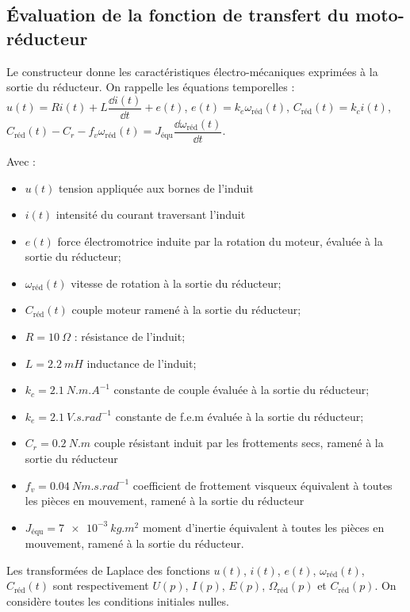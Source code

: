 \begin{multicols}{2}
\subsection*{Évaluation de la fonction de transfert du moto-réducteur}
\ifprof
\else
Le constructeur donne les caractéristiques électro-mécaniques exprimées à la sortie du réducteur.
On rappelle les équations temporelles :
$u(t) = R i(t) + L \dfrac{\dd i(t)}{\dd t} + e(t)$, $e(t) = k_e  \omega_{\text{réd}}(t)$, 
$C_{\text{réd}} (t)= k_c  i(t)$, $C_{\text{réd}} (t) - C_r - f_v \omega_{\text{réd}}(t)= J_{\text{équ}} \dfrac{\dd \omega_{\text{réd}}(t)}{\dd t}$. 

Avec :
\begin{itemize}
\item $u(t)$ tension appliquée aux bornes de l’induit 
\item $i(t)$ intensité du courant traversant l’induit
\item $e(t)$ force électromotrice induite par la rotation du moteur, évaluée à la  sortie du réducteur;
\item $\omega_{\text{réd}}(t)$ vitesse de rotation à la sortie du réducteur;
\item $C_{\text{réd}} (t)$ couple moteur ramené à la sortie du réducteur;
\item $R = \SI{10}{\Omega}$ : résistance de l’induit;
\item $L = \SI{2,2}{mH}$ inductance de l’induit;
\item $k_c = \SI{2,1}{N.m.A^{-1}}$ constante de couple évaluée à la sortie du réducteur;
\item $k_e = \SI{2,1}{V.s.rad^{-1}}$ constante de f.e.m évaluée à la sortie du réducteur;
\item $C_r = \SI{0,2}{N.m}$ couple résistant induit par les frottements secs, ramené à la sortie du réducteur 
\item $f_v = \SI{0,04}{Nm.s.rad^{-1}}$ coefficient de frottement visqueux équivalent à toutes les pièces en mouvement, ramené à la sortie du réducteur 
\item $J_{\text{équ}} = \SI{7e-3}{kg.m^2}$ moment d’inertie équivalent à toutes les pièces en mouvement, ramené à la sortie du réducteur. 
\end{itemize}

Les transformées de Laplace des fonctions $u(t)$, $i(t)$, $e(t)$, $\omega_{\text{réd}}(t)$,  $C_{\text{réd}}(t)$ sont respectivement $U(p)$, $I(p)$, $E(p)$, $\Omega_{\text{réd}}(p)$ et $C_{\text{réd}}(p)$. On considère toutes les conditions initiales nulles.


\end{multicols}
